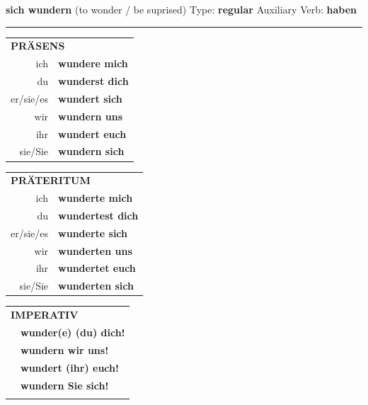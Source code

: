 \documentclass[10pt,a4paper]{revtex4-2}
\begin{document}
\begin{verbbox}
        {\Large \bf sich wundern} (to wonder / be suprised) \hfill Type: \textbf{regular} \hfill Auxiliary Verb: \textbf{haben} 
    
       \vspace{5pt}

    \hrule
    
    \vspace{5pt}

  \begin{tabular}{rl}
     \multicolumn{2}{l}{\textbf{PRÄSENS} }\\
    ich & \textbf{wundere mich}\\
    du & \textbf{wunderst dich}\\
    er/sie/es & \textbf{wundert sich}\\
    wir & \textbf{wundern uns}\\
    ihr & \textbf{wundert euch}\\
    sie/Sie & \textbf{wundern sich}\\
  \end{tabular}
  \hfill
     \begin{tabular}{rl}
    \multicolumn{2}{l}{\textbf{PRÄTERITUM} }\\
    ich & \textbf{wunderte mich}\\
    du & \textbf{wundertest dich}\\
    er/sie/es & \textbf{wunderte sich}\\
    wir & \textbf{wunderten uns}\\
    ihr & \textbf{wundertet euch}\\
    sie/Sie & \textbf{wunderten sich}\\
  \end{tabular}
  \hfill
  \begin{tabular}{rl}
     \multicolumn{2}{l}{\textbf{IMPERATIV} }\\
   & \textbf{wunder(e) (du) dich!}\\
   & \textbf{wundern wir uns!}\\
   & \textbf{wundert (ihr) euch!}\\
   & \textbf{wundern Sie sich!}\\
   & \vspace{10pt}
  \end{tabular}

    \vspace{10pt}


\end{verbbox}
\end{document}

